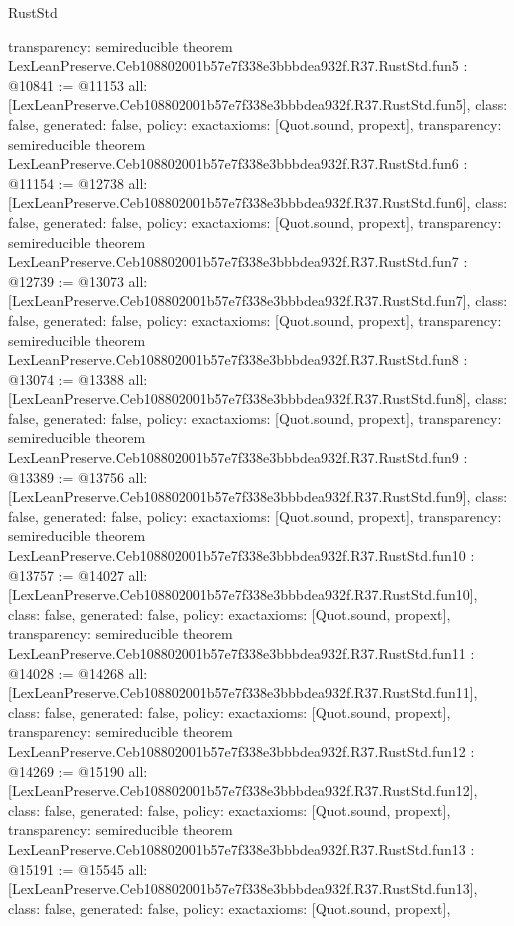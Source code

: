 \begin{lexlean}{RustStd}
\begin{coremodule}
{  transparency: semireducible
}
theorem LexLeanPreserve.Ceb108802001b57e7f338e3bbbdea932f.R37.RustStd.fun5 : @10841 := @11153 {
  all: [LexLeanPreserve.Ceb108802001b57e7f338e3bbbdea932f.R37.RustStd.fun5],
  class: false,
  generated: false,
  policy: exact{axioms: [Quot.sound, propext]},
  transparency: semireducible
}
theorem LexLeanPreserve.Ceb108802001b57e7f338e3bbbdea932f.R37.RustStd.fun6 : @11154 := @12738 {
  all: [LexLeanPreserve.Ceb108802001b57e7f338e3bbbdea932f.R37.RustStd.fun6],
  class: false,
  generated: false,
  policy: exact{axioms: [Quot.sound, propext]},
  transparency: semireducible
}
theorem LexLeanPreserve.Ceb108802001b57e7f338e3bbbdea932f.R37.RustStd.fun7 : @12739 := @13073 {
  all: [LexLeanPreserve.Ceb108802001b57e7f338e3bbbdea932f.R37.RustStd.fun7],
  class: false,
  generated: false,
  policy: exact{axioms: [Quot.sound, propext]},
  transparency: semireducible
}
theorem LexLeanPreserve.Ceb108802001b57e7f338e3bbbdea932f.R37.RustStd.fun8 : @13074 := @13388 {
  all: [LexLeanPreserve.Ceb108802001b57e7f338e3bbbdea932f.R37.RustStd.fun8],
  class: false,
  generated: false,
  policy: exact{axioms: [Quot.sound, propext]},
  transparency: semireducible
}
theorem LexLeanPreserve.Ceb108802001b57e7f338e3bbbdea932f.R37.RustStd.fun9 : @13389 := @13756 {
  all: [LexLeanPreserve.Ceb108802001b57e7f338e3bbbdea932f.R37.RustStd.fun9],
  class: false,
  generated: false,
  policy: exact{axioms: [Quot.sound, propext]},
  transparency: semireducible
}
theorem LexLeanPreserve.Ceb108802001b57e7f338e3bbbdea932f.R37.RustStd.fun10 : @13757 := @14027 {
  all: [LexLeanPreserve.Ceb108802001b57e7f338e3bbbdea932f.R37.RustStd.fun10],
  class: false,
  generated: false,
  policy: exact{axioms: [Quot.sound, propext]},
  transparency: semireducible
}
theorem LexLeanPreserve.Ceb108802001b57e7f338e3bbbdea932f.R37.RustStd.fun11 : @14028 := @14268 {
  all: [LexLeanPreserve.Ceb108802001b57e7f338e3bbbdea932f.R37.RustStd.fun11],
  class: false,
  generated: false,
  policy: exact{axioms: [Quot.sound, propext]},
  transparency: semireducible
}
theorem LexLeanPreserve.Ceb108802001b57e7f338e3bbbdea932f.R37.RustStd.fun12 : @14269 := @15190 {
  all: [LexLeanPreserve.Ceb108802001b57e7f338e3bbbdea932f.R37.RustStd.fun12],
  class: false,
  generated: false,
  policy: exact{axioms: [Quot.sound, propext]},
  transparency: semireducible
}
theorem LexLeanPreserve.Ceb108802001b57e7f338e3bbbdea932f.R37.RustStd.fun13 : @15191 := @15545 {
  all: [LexLeanPreserve.Ceb108802001b57e7f338e3bbbdea932f.R37.RustStd.fun13],
  class: false,
  generated: false,
  policy: exact{axioms: [Quot.sound, propext]},
}
\end{coremodule}
\end{lexlean}
